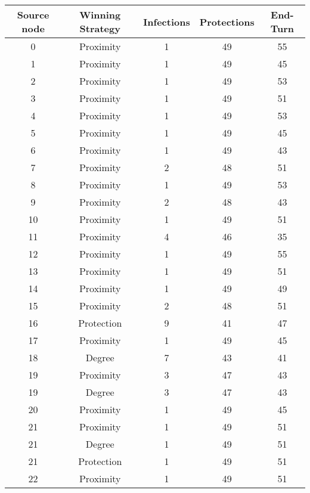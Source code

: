 \documentclass[results.tex]{subfiles}
\begin{document}
\begin{center}
  \begin{tabular}{| c || c | c | c | c |}
    \hline
    {\bfseries Source node} & {\bfseries Winning Strategy} & {\bfseries Infections} & {\bfseries Protections} & {\bfseries End-Turn} \\  %
    \hline\hline
    0 & Proximity & 1 & 49 & 55 \\ 
    \hline
    1 & Proximity & 1 & 49 & 45 \\ 
    \hline
    2 & Proximity & 1 & 49 & 53 \\ 
    \hline
    3 & Proximity & 1 & 49 & 51 \\ 
    \hline
    4 & Proximity & 1 & 49 & 53 \\ 
    \hline
    5 & Proximity & 1 & 49 & 45 \\ 
    \hline
    6 & Proximity & 1 & 49 & 43 \\ 
    \hline
    7 & Proximity & 2 & 48 & 51 \\ 
    \hline
    8 & Proximity & 1 & 49 & 53 \\ 
    \hline
    9 & Proximity & 2 & 48 & 43 \\ 
    \hline
    10 & Proximity & 1 & 49 & 51 \\ 
    \hline
    11 & Proximity & 4 & 46 & 35 \\ 
    \hline
    12 & Proximity & 1 & 49 & 55 \\ 
    \hline
    13 & Proximity & 1 & 49 & 51 \\ 
    \hline
    14 & Proximity & 1 & 49 & 49 \\ 
    \hline
    15 & Proximity & 2 & 48 & 51 \\ 
    \hline
    16 & Protection & 9 & 41 & 47 \\ 
    \hline
    17 & Proximity & 1 & 49 & 45 \\ 
    \hline
    18 & Degree & 7 & 43 & 41 \\ 
    \hline
    19 & Proximity & 3 & 47 & 43 \\ 
    \hline
    19 & Degree & 3 & 47 & 43 \\ 
    \hline
    20 & Proximity & 1 & 49 & 45 \\ 
    \hline
    21 & Proximity & 1 & 49 & 51 \\ 
    \hline
    21 & Degree & 1 & 49 & 51 \\ 
    \hline
    21 & Protection & 1 & 49 & 51 \\ 
    \hline
    22 & Proximity & 1 & 49 & 51 \\ 

\end{tabular}
\end{center}
\end{document}
